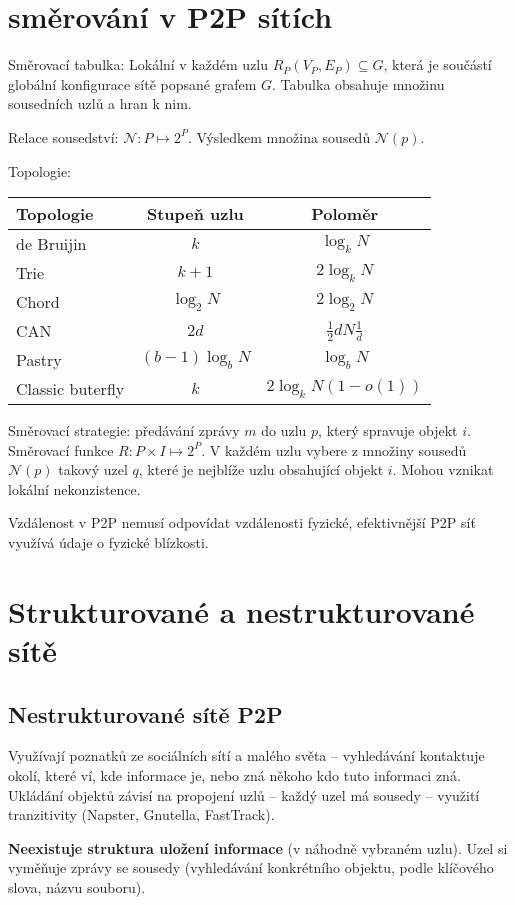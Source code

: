 \documentclass[a4paper, 11pt]{report}
\begin{document}
\section{směrování v P2P sítích}

Směrovací tabulka: Lokální v každém uzlu $R_P(V_P, E_P) \subseteq G$, která je součástí globální konfigurace sítě popsané grafem $G$. Tabulka obsahuje množinu sousedních uzlů a hran k nim.

Relace sousedství: $\mathcal{N}: P \mapsto 2^P$. Výsledkem množina sousedů $\mathcal{N}(p)$.

Topologie:
\begin{tabular}{l|c|c|}
Topologie		& Stupeň uzlu		& Poloměr \\ \hline
de Bruijin		& $k$				& $\log_k N$ \\ \hline
Trie			& $k+1$				& $2 \log_k N$ \\ \hline
Chord			& $\log_2 N$		& $2 \log_2 N$ \\ \hline
CAN				& $2d$				& $\frac{1}{2} d N \frac{1}{d}$ \\ \hline
Pastry			& $(b-1) \log_b N$	& $\log_b N$ \\ \hline
Classic buterfly& $k$				& $2 \log_k N(1-o(1))$ \\ \hline
\end{tabular}

Směrovací strategie: předávání zprávy $m$ do uzlu $p$, který spravuje objekt $i$. Směrovací funkce $R: P \times I \mapsto 2^P$. V každém uzlu vybere z množiny sousedů $\mathcal{N}(p)$ takový uzel $q$, které je nejblíže uzlu obsahující objekt $i$. Mohou vznikat lokální nekonzistence.

Vzdálenost v P2P nemusí odpovídat vzdálenosti fyzické, efektivnější P2P síť využívá údaje o fyzické blízkosti.

\section{Strukturované a nestrukturované sítě}
\subsection{Nestrukturované sítě P2P}
Využívají poznatků ze sociálních sítí a malého světa -- vyhledávání kontaktuje okolí, které ví, kde informace je, nebo zná někoho kdo tuto informaci zná. Ukládání objektů závisí na propojení uzlů -- každý uzel má sousedy -- využití tranzitivity (Napster, Gnutella, FastTrack).

\textbf{Neexistuje struktura uložení informace} (v náhodně vybraném uzlu). Uzel si vyměňuje zprávy se sousedy (vyhledávání konkrétního objektu, podle klíčového slova, názvu souboru).
\end{document}
